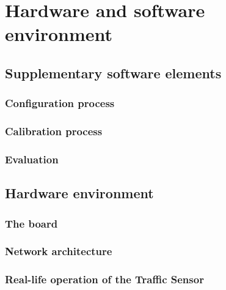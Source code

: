 \chapter{Hardware and software environment}\label{chap:Environment}
\section{Supplementary software elements}

\subsection{Configuration process}
\subsection{Calibration process}
\subsection{Evaluation}

\section{Hardware environment}

\subsection{The board}
\subsection{Network architecture}
\subsection{Real-life operation of the Traffic Sensor}


